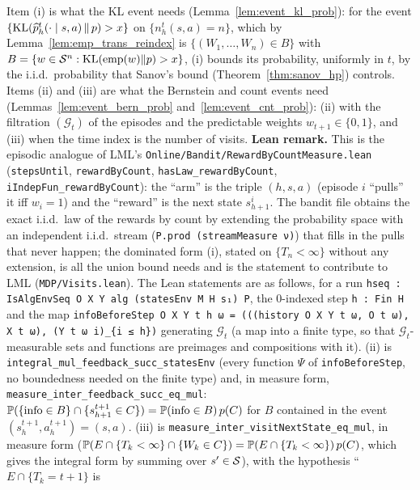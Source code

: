 \begin{remark}\label{rem:pmdp_visits_iid}
Item (i) is what the KL event needs (Lemma~\ref{lem:event_kl_prob}): for the event
$\{\mathrm{KL}(\widehat{p}^t_h(\cdot\mid s,a)\,\|\,p) > x\}$ on $\{n^t_h(s,a) = n\}$, which by
Lemma~\ref{lem:emp_trans_reindex} is $\{(W_1,\dots,W_n) \in B\}$ with
$B = \{w \in \mathcal{S}^n : \mathrm{KL}(\mathrm{emp}(w)\|p) > x\}$, (i) bounds its probability, uniformly in
$t$, by the i.i.d.\ probability that Sanov's bound (Theorem~\ref{thm:sanov_hp}) controls.
Items (ii) and (iii) are what the Bernstein and count events need
(Lemmas~\ref{lem:event_bern_prob} and~\ref{lem:event_cnt_prob}): (ii) with the filtration
$(\mathcal G_t)$ of the episodes and the predictable weights $w_{t+1} \in \{0, 1\}$, and (iii)
when the time index is the number of visits. \textbf{Lean remark.} This is the episodic
analogue of LML's \texttt{Online/Bandit/RewardByCountMeasure.lean}
(\texttt{stepsUntil}, \texttt{rewardByCount}, \texttt{hasLaw\_rewardByCount},
\texttt{iIndepFun\_rewardByCount}): the ``arm'' is the triple $(h, s, a)$ (episode $i$ ``pulls''
it iff $w_i = 1$) and the ``reward'' is the next state $s^i_{h+1}$. The bandit file obtains the
exact i.i.d.\ law of the rewards by count by extending the probability space with an
independent i.i.d.\ stream (\texttt{P.prod (streamMeasure ν)}) that fills in the pulls that never
happen; the dominated form (i), stated on $\{T_n < \infty\}$ without any extension, is all the
union bound needs and is the statement to contribute to LML (\texttt{MDP/Visits.lean}). The Lean
statements are as follows, for a run \texttt{hseq : IsAlgEnvSeq O X Y alg (statesEnv M H s₁) P}, the
$0$-indexed step \texttt{h : Fin H} and the map
\texttt{infoBeforeStep O X Y t h ω = (((history O X Y t ω, O t ω), X t ω), (Y t ω i)\_\{i ≤ h\})}
generating $\mathcal G_t$ (a map into a finite type, so that $\mathcal G_t$-measurable sets and
functions are preimages and compositions with it).
(ii) is \texttt{integral\_mul\_feedback\_succ\_statesEnv} (every function $\Psi$ of
\texttt{infoBeforeStep}, no boundedness needed on the finite type) and, in measure form,
\texttt{measure\_inter\_feedback\_succ\_eq\_mul}: $\mathbb{P}(\{\mathrm{info} \in B\} \cap \{s^{t+1}_{h+1} \in C\})
= \mathbb{P}(\mathrm{info} \in B)\,p(C)$ for $B$ contained in the event $(s^{t+1}_h, a^{t+1}_h) = (s, a)$.
(iii) is \texttt{measure\_inter\_visitNextState\_eq\_mul}, in measure form
($\mathbb{P}(E \cap \{T_k < \infty\} \cap \{W_k \in C\}) = \mathbb{P}(E \cap \{T_k < \infty\})\,p(C)$, which gives
the integral form by summing over $s' \in \mathcal{S}$), with the hypothesis ``$E \cap \{T_k = t + 1\}$ is

\end{remark}
